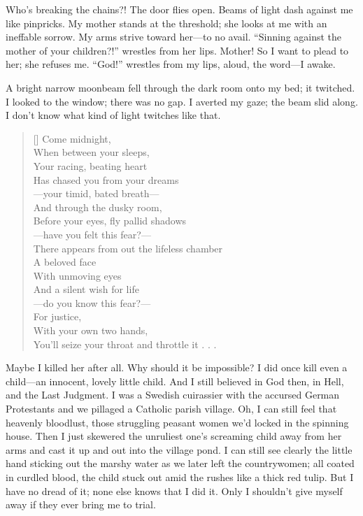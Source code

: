 \documentclass[12pt,a4paper]{article}
\begin{document}
Who’s breaking the chains?! The door flies open. Beams of light dash against me like pinpricks. My mother stands at the threshold; she looks at me with an ineffable sorrow. My arms strive toward her—to no avail. “Sinning against the mother of your children?!” wrestles from her lips. Mother! So I want to plead to her; she refuses me. “God!” wrestles from my lips, aloud, the word—I awake.

A bright narrow moonbeam fell through the dark room onto my bed; it twitched. I looked to the window; there was no gap. I averted my gaze; the beam slid along. I don’t know what kind of light twitches like that.

\settowidth{\versewidth}{There appears from out the lifeless chamber}
\begin{verse}[\versewidth]
Come midnight, \\
When between your sleeps, \\
Your racing, beating heart \\
Has chased you from your dreams \\
—your timid, bated breath— \\
And through the dusky room, \\
Before your eyes, fly pallid shadows \\
—have you felt this fear?— \\
There appears from out the lifeless chamber \\
A beloved face \\
With unmoving eyes \\
And a silent wish for life \\
—do you know this fear?— \\
For justice, \\
With your own two hands, \\
You’ll seize your throat and throttle it . . . 
\end{verse}

\vspace{20pt}\noindent{}\vspace{10pt}

Maybe I killed her after all. Why should it be impossible? I did once kill even a child—an innocent, lovely little child. And I still believed in God then, in Hell, and the Last Judgment. I was a Swedish cuirassier with the accursed German Protestants and we pillaged a Catholic parish village. Oh, I can still feel that heavenly bloodlust, those struggling peasant women we’d locked in the spinning house. Then I just skewered the unruliest one’s screaming child away from her arms and cast it up and out into the village pond. I can still see clearly the little hand sticking out the marshy water as we later left the countrywomen; all coated in curdled blood, the child stuck out amid the rushes like a thick red tulip. But I have no dread of it; none else knows that I did it. Only I shouldn’t give myself away if they ever bring me to trial.
\end{document}
